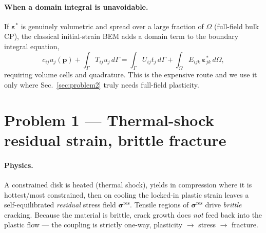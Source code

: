 \documentclass[11pt]{article}
\newcommand{\bdry}{\Gamma}
\newcommand{\dom}{\Omega}
\newcommand{\epsstar}{\bm{\varepsilon}^{*}}
\newcommand{\sig}{\bm{\sigma}}
\begin{document}
\paragraph{When a domain integral is unavoidable.} If $\epsstar$ is genuinely
volumetric and spread over a large fraction of $\dom$ (full-field bulk CP), the
classical initial-strain BEM \citep{telles1983,brebbia1984,aliabadi2002} adds a
domain term to the boundary integral equation,
\begin{equation}
c_{ij}u_j(\mathbf p)+\!\int_{\bdry}\!T_{ij}u_j\,d\bdry
=\!\int_{\bdry}\!U_{ij}t_j\,d\bdry
+\int_{\dom} \! E_{ijk}\,\epsstar_{jk}\,d\dom,
\label{eq:bie-domain}
\end{equation}
requiring volume cells and quadrature. This is the expensive route and we use it
only where Sec.~\ref{sec:problem2} truly needs full-field plasticity.

\section{Problem 1 --- Thermal-shock residual strain, brittle fracture}
\label{sec:problem1}

\paragraph{Physics.} A constrained disk is heated (thermal shock), yields in
compression where it is hottest/most constrained, then on cooling the locked-in
plastic strain leaves a self-equilibrated \emph{residual} stress field
$\sig^{\mathrm{res}}$. Tensile regions of $\sig^{\mathrm{res}}$ drive
\emph{brittle} cracking. Because the material is brittle, crack growth does
\emph{not} feed back into the plastic flow --- the coupling is strictly one-way,
plasticity $\rightarrow$ stress $\rightarrow$ fracture.
\end{document}

